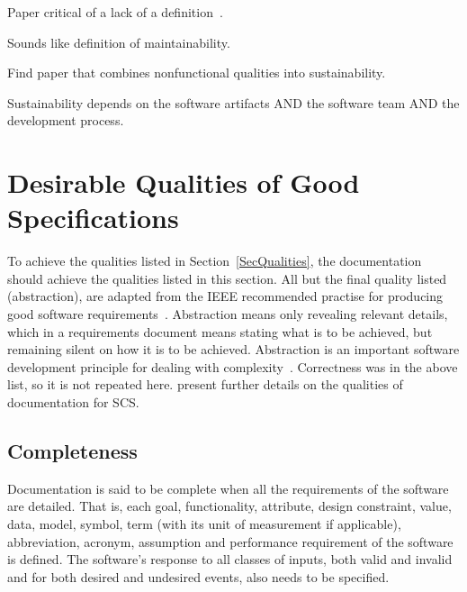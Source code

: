 \documentclass[letterpaper,cleveref]{lipics-v2019}
\theoremstyle{definition}
\begin{document}
Paper critical of a lack of a definition~\cite{VentersEtAl2014}.

Sounds like definition of maintainability.

Find paper that combines nonfunctional qualities into sustainability.

Sustainability depends on the software artifacts AND the software team AND the
development process.

\section{Desirable Qualities of Good Specifications} \label{SecDesirableQs}

To achieve the qualities listed in Section~\ref{SecQualities}, the documentation
should achieve the qualities listed in this section.  All but the final quality
listed (abstraction), are adapted from the IEEE recommended practise for
producing good software requirements~\cite{IEEE1998}.  Abstraction means only
revealing relevant details, which in a requirements document means stating what
is to be achieved, but remaining silent on how it is to be achieved.
Abstraction is an important software development principle for dealing with
complexity~\cite[p.~40]{GhezziEtAl2003}.  Correctness was in the above list, so
it is not repeated here.  \citet{SmithAndKoothoor2016} present further details
on the qualities of documentation for SCS.

\subsection{Completeness}

Documentation is said to be complete when all the requirements of the software
are detailed. That is, each goal, functionality, attribute, design constraint,
value, data, model, symbol, term (with its unit of measurement if applicable),
abbreviation, acronym, assumption and performance requirement of the software is
defined.  The software's response to all classes of inputs, both valid and
invalid and for both desired and undesired events, also needs to be specified.
\end{document}
